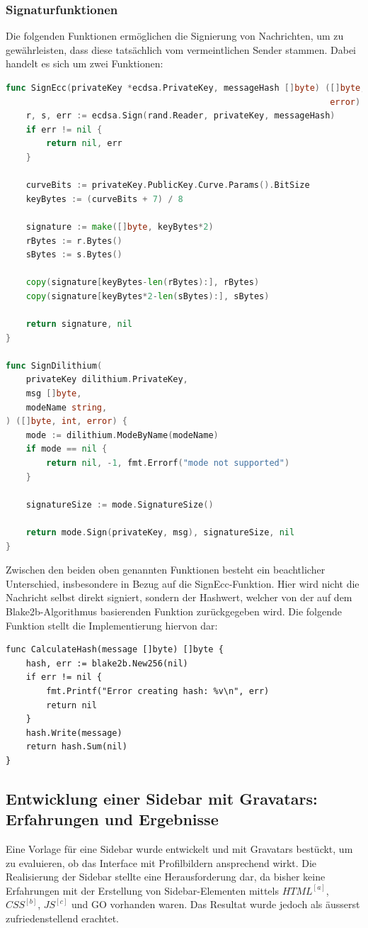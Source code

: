 \subsubsection{Signaturfunktionen}
Die folgenden Funktionen ermöglichen die Signierung von Nachrichten, um zu gewährleisten, dass diese tatsächlich vom vermeintlichen Sender stammen. Dabei handelt es sich um zwei Funktionen:
\begin{lstlisting}[language=Go]
func SignEcc(privateKey *ecdsa.PrivateKey, messageHash []byte) ([]byte,
                                                                error) {
	r, s, err := ecdsa.Sign(rand.Reader, privateKey, messageHash)
	if err != nil {
		return nil, err
	}

	curveBits := privateKey.PublicKey.Curve.Params().BitSize
	keyBytes := (curveBits + 7) / 8

	signature := make([]byte, keyBytes*2)
	rBytes := r.Bytes()
	sBytes := s.Bytes()

	copy(signature[keyBytes-len(rBytes):], rBytes)
	copy(signature[keyBytes*2-len(sBytes):], sBytes)

	return signature, nil
}

func SignDilithium(
	privateKey dilithium.PrivateKey,
	msg []byte,
	modeName string,
) ([]byte, int, error) {
	mode := dilithium.ModeByName(modeName)
	if mode == nil {
		return nil, -1, fmt.Errorf("mode not supported")
	}

	signatureSize := mode.SignatureSize()

	return mode.Sign(privateKey, msg), signatureSize, nil
}
\end{lstlisting}
Zwischen den beiden oben genannten Funktionen besteht ein beachtlicher Unterschied, insbesondere in Bezug auf die SignEcc-Funktion. Hier wird nicht die Nachricht selbst direkt signiert, sondern der Hashwert, welcher von der auf dem Blake2b-Algorithmus basierenden Funktion zurückgegeben wird. Die folgende Funktion stellt die Implementierung hiervon dar:
\begin{lstlisting}
func CalculateHash(message []byte) []byte {
	hash, err := blake2b.New256(nil)
	if err != nil {
		fmt.Printf("Error creating hash: %v\n", err)  
		return nil
	}
	hash.Write(message)
	return hash.Sum(nil)
}
\end{lstlisting}
\subsection{Entwicklung einer Sidebar mit Gravatars: Erfahrungen und Ergebnisse}
Eine Vorlage für eine Sidebar wurde entwickelt und mit Gravatars bestückt, um zu evaluieren, ob das Interface mit Profilbildern ansprechend wirkt. Die Realisierung der Sidebar stellte eine Herausforderung dar, da bisher keine Erfahrungen mit der Erstellung von Sidebar-Elementen mittels \hyperref[glo:html1]{\(HTML^{[a]}\)}, \hyperref[glo:css]{\(CSS^{[b]}\)}, \hyperref[glo:js]{\(JS^{[c]}\)} und GO vorhanden waren. Das Resultat wurde jedoch als äusserst zufriedenstellend erachtet.
